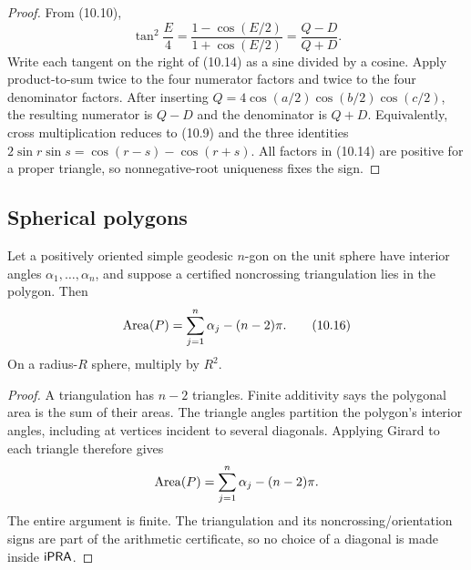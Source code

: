\begin{proof}
From (10.10),
\begin{equation}
 \tan^2\frac E4=\frac{1-\cos(E/2)}{1+\cos(E/2)}
 =\frac{Q-D}{Q+D}.                                         \tag{10.15}
\end{equation}
Write each tangent on the right of (10.14) as a sine divided by a cosine.
Apply product-to-sum twice to the four numerator factors and twice to the four
denominator factors.  After inserting
\(Q=4\cos(a/2)\cos(b/2)\cos(c/2)\), the resulting numerator is
\(Q-D\) and the denominator is \(Q+D\).  Equivalently, cross multiplication
reduces to (10.9) and the three identities
\(2\sin r\sin s=\cos(r-s)-\cos(r+s)\).  All factors in (10.14) are positive
for a proper triangle, so nonnegative-root uniqueness fixes the sign.
\end{proof}

\subsection{Spherical polygons}

\begin{theorem}
\label{thm:polygon-excess}
Let a positively oriented simple geodesic \(n\)-gon on the unit sphere have
interior angles \(\alpha_1,\ldots,\alpha_n\), and suppose a certified
noncrossing triangulation lies in the polygon.  Then
\begin{equation}
 \operatorname{Area}(P)=\sum_{j=1}^n\alpha_j-(n-2)\pi.                   \tag{10.16}
\end{equation}
On a radius-\(R\) sphere, multiply by \(R^2\).
\end{theorem}

\begin{proof}
A triangulation has \(n-2\) triangles.  Finite additivity says the polygonal
area is the sum of their areas.  The triangle angles partition the polygon's
interior angles, including at vertices incident to several diagonals.  Applying
Girard to each triangle therefore gives
\[
 \operatorname{Area}(P)
 =\sum_{j=1}^n\alpha_j-(n-2)\pi.
\]
The entire argument is finite.  The triangulation and its noncrossing/orientation
signs are part of the arithmetic certificate, so no choice of a diagonal is
made inside \(\mathsf{iPRA}\).
\end{proof}
